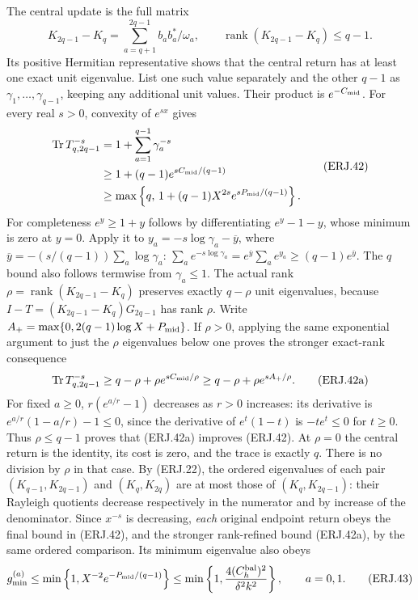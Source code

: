 \documentclass[11pt]{article}
\newcommand{\Tr}{\operatorname{Tr}}\newcommand{\diag}{\operatorname{diag}}
\begin{document}
The central update is the full matrix
\[
 K_{2q-1}-K_q=\sum_{a=q+1}^{2q-1}b_ab_a^*/\omega_a,
 \qquad\operatorname{rank}(K_{2q-1}-K_q)\le q-1.
 \tag{ERJ.41}
\]
Its positive Hermitian representative shows that the central return
has at least one exact unit eigenvalue. List one such value separately
and the other $q-1$ as $\gamma_1,\ldots,\gamma_{q-1}$, keeping
any additional unit values. Their product is $e^{-C_{\rm mid}}$.
For every real $s>0$, convexity of $e^{sx}$ gives
\[
\begin{split}
 \Tr T_{q,2q-1}^{-s}
 &=1+\sum_{a=1}^{q-1}\gamma_a^{-s}\\
 &\ge1+(q-1)e^{sC_{\rm mid}/(q-1)}\\
 &\ge\max\left\{q,\,
 1+(q-1)X^{2s}e^{sP_{\rm mid}/(q-1)}\right\}.
\end{split}\tag{ERJ.42}
\]
For completeness $e^y\ge1+y$ follows by differentiating
$e^y-1-y$, whose minimum is zero at $y=0$.
Apply it to $y_a=-s\log\gamma_a-\overline y$, where
$\overline y=-(s/(q-1))\sum_a\log\gamma_a$:
$\sum_a e^{-s\log\gamma_a}
=e^{\overline y}\sum_a e^{y_a}\ge(q-1)e^{\overline y}$.
The $q$ bound also follows termwise from
$\gamma_a\le1$.
The actual rank $\rho=\operatorname{rank}(K_{2q-1}-K_q)$ preserves
exactly $q-\rho$ unit eigenvalues, because
$I-T=(K_{2q-1}-K_q)G_{2q-1}$ has rank $\rho$.
Write $A_+=\max\{0,2(q-1)\log X+P_{\rm mid}\}$. If $\rho>0$,
applying the same exponential argument to just the $\rho$ eigenvalues
below one proves the stronger exact-rank consequence
\[
 \Tr T_{q,2q-1}^{-s}
 \ge q-\rho+\rho e^{sC_{\rm mid}/\rho}
 \ge q-\rho+\rho e^{sA_+/\rho}.\tag{ERJ.42a}
\]
For fixed $a\ge0$, $r(e^{a/r}-1)$ decreases as $r>0$ increases:
its derivative is $e^{a/r}(1-a/r)-1\le0$, since the derivative of
$e^t(1-t)$ is $-te^t\le0$ for $t\ge0$. Thus $\rho\le q-1$
proves that (ERJ.42a) improves (ERJ.42). At $\rho=0$ the central
return is the identity, its cost is zero, and the trace is exactly $q$.
There is no division by $\rho$ in that case.
By (ERJ.22), the ordered eigenvalues of each pair
$(K_{q-1},K_{2q-1})$ and $(K_q,K_{2q})$ are at most those of
$(K_q,K_{2q-1})$: their Rayleigh quotients decrease respectively
in the numerator and by increase of the denominator. Since $x^{-s}$
is decreasing, \emph{each} original endpoint return obeys the final
bound in (ERJ.42), and the stronger rank-refined bound (ERJ.42a),
by the same ordered comparison. Its minimum eigenvalue also obeys
\[
 g_{\min}^{(a)}\le
 \min\left\{1,X^{-2}e^{-P_{\rm mid}/(q-1)}\right\}
 \le\min\left\{1,\frac{4(C_h^{\rm bal})^2}{\delta^2k^2}\right\},
 \qquad a=0,1.\tag{ERJ.43}
\]
\end{document}
